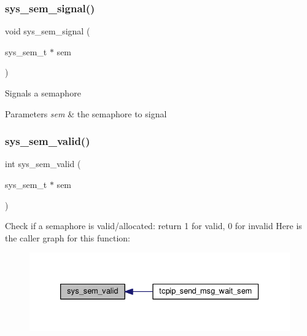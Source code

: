 \subsubsection{\texorpdfstring{sys\+\_\+sem\+\_\+signal()}{sys\_sem\_signal()}}
{\footnotesize\ttfamily void sys\+\_\+sem\+\_\+signal (\begin{DoxyParamCaption}\item[{sys\+\_\+sem\+\_\+t $\ast$}]{sem }\end{DoxyParamCaption})}

Signals a semaphore 
\begin{DoxyParams}{Parameters}
{\em sem} & the semaphore to signal \\
\hline
\end{DoxyParams}
\mbox{\label{group__sys__sem_ga09a6c052ddaf799139efc56adfa087e4}} 
\subsubsection{\texorpdfstring{sys\+\_\+sem\+\_\+valid()}{sys\_sem\_valid()}}
{\footnotesize\ttfamily int sys\+\_\+sem\+\_\+valid (\begin{DoxyParamCaption}\item[{sys\+\_\+sem\+\_\+t $\ast$}]{sem }\end{DoxyParamCaption})}

Check if a semaphore is valid/allocated\+: return 1 for valid, 0 for invalid Here is the caller graph for this function\+:
\nopagebreak
\begin{figure}[H]
\begin{center}
\leavevmode
\includegraphics[width=333pt]{group__sys__sem_ga09a6c052ddaf799139efc56adfa087e4_icgraph}
\end{center}
\end{figure}
